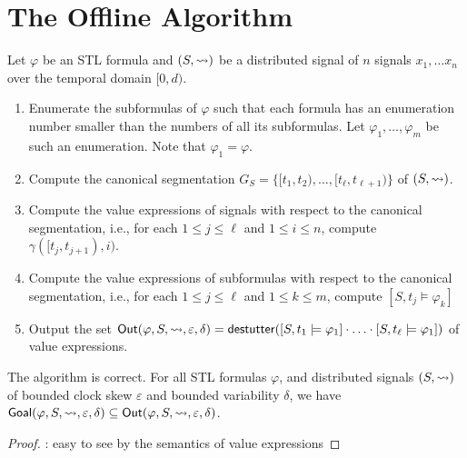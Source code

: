 \section{The Offline Algorithm}

Let $\varphi$ be an STL formula and $(S,{\rightsquigarrow})$ be a distributed signal of $n$ signals $x_1, \ldots x_n$ over the temporal domain $[0,d)$.

\begin{enumerate}
	\item 
	Enumerate the subformulas of $\varphi$ such that each formula has an enumeration number smaller than the numbers of all its subformulas.
	Let $\varphi_1, \ldots, \varphi_m$ be such an enumeration.
	Note that $\varphi_1 = \varphi$.
	
	\item
	Compute the canonical segmentation $G_{S} = \{ [t_1, t_2), \ldots, [t_\ell, t_{\ell+1}) \}$ of $(S, {\rightsquigarrow})$.
	
	\item
	Compute the value expressions of signals with respect to the canonical segmentation, i.e., for each $1 \leq j \leq \ell$ and $1 \leq i \leq n$, compute $\gamma([t_j, t_{j+1}), i)$.
	
	\item
	Compute the value expressions of subformulas with respect to the canonical segmentation, i.e., for each $1 \leq j \leq \ell$ and $1 \leq k \leq m$, compute $[S, t_j \models \varphi_k]$
	
	\item
	Output the set $\mathsf{Out}(\varphi, S, {\rightsquigarrow}, \varepsilon, \delta) = \mathsf{destutter}([S,t_1 \models \varphi_1] \cdot \ldots \cdot [S,t_\ell \models \varphi_1])$ of value expressions. %
\end{enumerate}

\begin{claim}
	The algorithm is correct.
	For all STL formulas $\varphi$, and distributed signals $(S, {\rightsquigarrow})$ of bounded clock skew $\varepsilon$ and bounded variability $\delta$, we have $\mathsf{Goal}(\varphi, S, {\rightsquigarrow}, \varepsilon, \delta) \subseteq \mathsf{Out}(\varphi, S, {\rightsquigarrow}, \varepsilon, \delta)$.
\end{claim}
\begin{proof}
	\TODO: easy to see by the semantics of value expressions
\end{proof}

